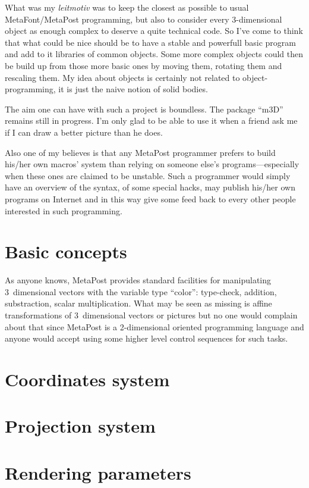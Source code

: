 What was my {\it leitmotiv}\/
was to keep the closest as possible to usual MetaFont/MetaPost
programming, but also to consider every 3-dimensional object
as enough complex to deserve a quite technical code.
So I've come to think that what could be nice should be to
have a stable and powerfull basic program and add to it libraries
of common objects. Some more complex objects could then be build up
from those more basic ones by moving them, rotating them and
rescaling them. My idea about objects is certainly not related to
object-programming, it is just the naive notion of solid bodies.

The aim one can have with such a project is boundless.
The package ``m3D'' remains still in progress. I'm only
glad to be able to use it when a friend ask me if I can
draw a better picture than he does.

Also one of my believes is that any MetaPost programmer
prefers to build his/her own macros' system than relying
on someone else's programs---especially when these ones
are claimed to be unstable. Such a programmer would
simply have an overview of the syntax, of some special
hacks, may publish his/her own programs on Internet
and in this way give some feed back to every other
people interested in such programming.
 
\section{Basic concepts}

As anyone knows, MetaPost provides standard facilities
for manipulating 3~dimensional vectors with the variable
type ``color'': type-check, addition, substraction, scalar
multiplication. What may be seen as missing is affine
transformations of 3~dimensional vectors or pictures
but no one would complain about that since MetaPost
is a 2-dimensional oriented programming language
and anyone would accept using some higher level
control sequences for such tasks.

  
\section{Coordinates system}

\section{Projection system}

\section{Rendering parameters}

